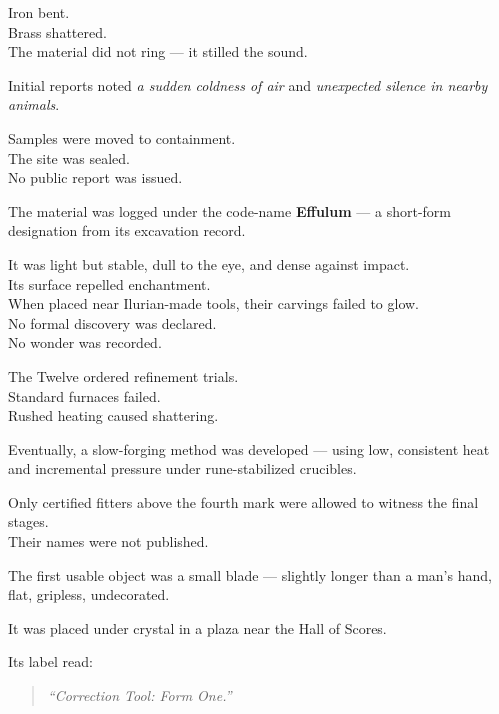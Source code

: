 \documentclass[12pt]{article}
\begin{document}
Iron bent.\\
Brass shattered.\\
The material did not ring — it stilled the sound.

Initial reports noted \textit{a sudden coldness of air} and \textit{unexpected silence in nearby animals}.

Samples were moved to containment.\\
The site was sealed.\\
No public report was issued.

\vspace{1em}

The material was logged under the code-name \textbf{Effulum} — a short-form designation from its excavation record.

It was light but stable, dull to the eye, and dense against impact.\\
Its surface repelled enchantment.\\
When placed near Ilurian-made tools, their carvings failed to glow.\\

No formal discovery was declared.\\
No wonder was recorded.

\vspace{1em}

The Twelve ordered refinement trials.\\
Standard furnaces failed.\\
Rushed heating caused shattering.

Eventually, a slow-forging method was developed — using low, consistent heat and incremental pressure under rune-stabilized crucibles.

Only certified fitters above the fourth mark were allowed to witness the final stages.\\
Their names were not published.

\vspace{1em}

The first usable object was a small blade — slightly longer than a man’s hand, flat, gripless, undecorated.

It was placed under crystal in a plaza near the Hall of Scores.

Its label read:

\begin{quote}
\textit{“Correction Tool: Form One.”}
\end{quote}

\vspace{1em}
\end{document}
